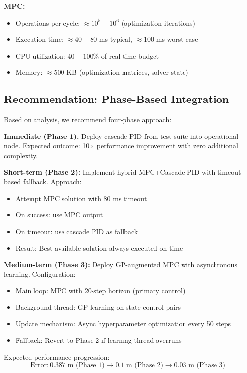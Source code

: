 \documentclass[journal]{IEEEtran}
\begin{document}
\textbf{MPC:}
\begin{itemize}
    \item Operations per cycle: $\approx 10^5-10^6$ (optimization iterations)
    \item Execution time: $\approx 40-80$ ms typical, $\approx 100$ ms worst-case
    \item CPU utilization: $40-100\%$ of real-time budget
    \item Memory: $\approx 500$ KB (optimization matrices, solver state)
\end{itemize}

\subsection{Recommendation: Phase-Based Integration}

Based on analysis, we recommend four-phase approach:

\textbf{Immediate (Phase 1):} Deploy cascade PID from test suite into operational node. Expected outcome: 10$\times$ performance improvement with zero additional complexity.

\textbf{Short-term (Phase 2):} Implement hybrid MPC+Cascade PID with timeout-based fallback. Approach:
\begin{itemize}
    \item Attempt MPC solution with 80 ms timeout
    \item On success: use MPC output
    \item On timeout: use cascade PID as fallback
    \item Result: Best available solution always executed on time
\end{itemize}

\textbf{Medium-term (Phase 3):} Deploy GP-augmented MPC with asynchronous learning. Configuration:
\begin{itemize}
    \item Main loop: MPC with 20-step horizon (primary control)
    \item Background thread: GP learning on state-control pairs
    \item Update mechanism: Async hyperparameter optimization every 50 steps
    \item Fallback: Revert to Phase 2 if learning thread overruns
\end{itemize}

Expected performance progression:
\begin{equation}
\text{Error}: 0.387\text{ m (Phase 1)} \to 0.1\text{ m (Phase 2)} \to 0.03\text{ m (Phase 3)}
\end{equation}
\end{document}
